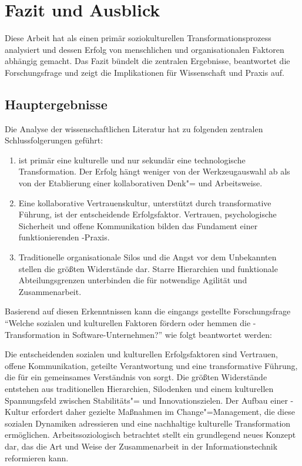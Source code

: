 \chapter{Fazit und Ausblick}
\label{ch:conclusion}

Diese Arbeit hat \DO als einen primär soziokulturellen Transformationsprozess analysiert und dessen Erfolg von menschlichen und organisationalen Faktoren abhängig gemacht.
Das Fazit bündelt die zentralen Ergebnisse, beantwortet die Forschungsfrage und zeigt die Implikationen für Wissenschaft und Praxis auf.

\section{Hauptergebnisse}
Die Analyse der wissenschaftlichen Literatur hat zu folgenden zentralen Schlussfolgerungen geführt:

\begin{enumerate}
	\item \DO ist primär eine kulturelle und nur sekundär eine technologische Transformation. Der Erfolg hängt weniger von der Werkzeugauswahl ab als von der Etablierung einer kollaborativen Denk"= und Arbeitsweise.
	\item Eine kollaborative Vertrauenskultur, unterstützt durch transformative Führung, ist der entscheidende Erfolgsfaktor. Vertrauen, psychologische Sicherheit und offene Kommunikation bilden das Fundament einer funktionierenden \DO-Praxis.
	\item Traditionelle organisationale Silos und die Angst vor dem Unbekannten stellen die größten Widerstände dar. Starre Hierarchien und funktionale Abteilungsgrenzen unterbinden die für \DO notwendige Agilität und Zusammenarbeit.
\end{enumerate}

Basierend auf diesen Erkenntnissen kann die eingangs gestellte Forschungsfrage \enquote{Welche sozialen und kulturellen Faktoren fördern oder hemmen die \DO-Transformation in Software-Unternehmen?} wie folgt beantwortet werden:

Die entscheidenden sozialen und kulturellen Erfolgsfaktoren sind Vertrauen, offene Kommunikation, geteilte Verantwortung und eine transformative Führung, die für ein gemeinsames Verständnis von \DO sorgt.
Die größten Widerstände entstehen aus traditionellen Hierarchien, Silodenken und einem kulturellen Spannungsfeld zwischen Stabilitäts"= und Innovationszielen.
Der Aufbau einer \DO-Kultur erfordert daher gezielte Maßnahmen im Change"=Management, die diese sozialen Dynamiken adressieren und eine nachhaltige kulturelle Transformation ermöglichen.
Arbeitssoziologisch betrachtet stellt \DO ein grundlegend neues Konzept dar, das die Art und Weise der Zusammenarbeit in der Informationstechnik reformieren kann.


